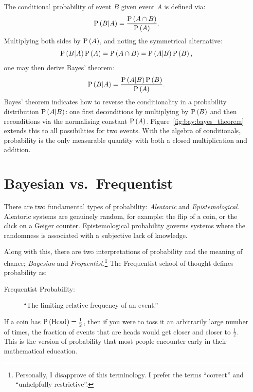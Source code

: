 The conditional probability of event \(B\) given event \(A\) is defined via:
\begin{equation}
  \mathrm{P}\left(B\middle|A\right) = \frac{\mathrm{P}\left(A\cap B\right)}{\mathrm{P}\left(A\right)}.
  \label{eqn:bay:cond}
\end{equation}
Multiplying both sides by \(\mathrm{P}\left(A\right)\), and noting the symmetrical alternative:
\begin{equation}
  \mathrm{P}\left(B\middle|A\right)\mathrm{P}\left(A\right) = \mathrm{P}\left(A\cap B\right) = \mathrm{P}\left(A\middle|B\right)\mathrm{P}\left(B\right),
  \label{eqn:bay:sym}
\end{equation}
one may then derive Bayes' theorem:
\begin{equation}
  \mathrm{P}\left(B\middle|A\right) = \frac{\mathrm{P}\left(A\middle|B\right)\mathrm{P}\left(B\right)}{\mathrm{P}\left(A\right)}.
  \label{eqn:bay:bayes}
\end{equation}
Bayes' theorem indicates how to reverse the conditionality in a probability distribution \(\mathrm{P}\left(A\middle|B\right)\): one first deconditions by multiplying by \(\mathrm{P}\left(B\right)\) and then reconditions via the normalising constant \(\mathrm{P}\left(A\right)\). Figure~\ref{fig:bay:bayes_theorem} extends this to all possibilities for two events.
With the algebra of conditionals, probability is the only measurable quantity with both a closed multiplication and addition.

\section{Bayesian vs.\ Frequentist}
\label{sec:bay:bayesian_frequentist}

There are two fundamental types of probability: {\em Aleatoric\/} and {\em Epistemological}. Aleatoric systems are genuinely random, for example: the flip of a coin, or the click on a Geiger counter. Epistemological probability governs systems where the randomness is associated with a subjective lack of knowledge. 

Along with this, there are two interpretations of probability and the meaning of chance; {\em Bayesian\/} and {\em Frequentist}.\footnote{Personally, I disapprove of this terminology. I prefer the terms ``correct'' and ``unhelpfully restrictive''.}
The Frequentist school of thought defines probability as:
\begin{description}
  \item[Frequentist Probability:]``The limiting relative frequency of an event.''
\end{description}
If a coin has \(\mathrm{P}\left(\mathrm{Head}\right)=\frac{1}{2}\), then if you were to toss it an arbitrarily large number of times, the fraction of events that are heads would get closer and closer to \(\frac{1}{2}\). This is the version of probability that most people encounter early in their mathematical education. 

